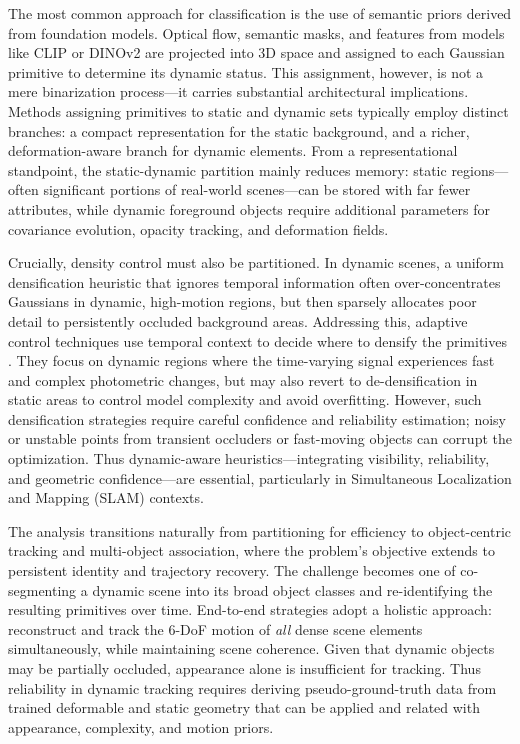 \documentclass[11pt,a4paper]{article}
\begin{document}
The most common approach for classification is the use of semantic priors derived from foundation models. Optical flow, semantic masks, and features from models like CLIP or DINOv2 are projected into 3D space and assigned to each Gaussian primitive to determine its dynamic status. This assignment, however, is not a mere binarization process---it carries substantial architectural implications. Methods assigning primitives to static and dynamic sets typically employ distinct branches: a compact representation for the static background, and a richer, deformation-aware branch for dynamic elements. From a representational standpoint, the static-dynamic partition mainly reduces memory: static regions---often significant portions of real-world scenes---can be stored with far fewer attributes, while dynamic foreground objects require additional parameters for covariance evolution, opacity tracking, and deformation fields.

Crucially, density control must also be partitioned. In dynamic scenes, a uniform densification heuristic that ignores temporal information often over-concentrates Gaussians in dynamic, high-motion regions, but then sparsely allocates poor detail to persistently occluded background areas. Addressing this, adaptive control techniques use temporal context to decide where to densify the primitives \cite{arxiv:2606.00352v1}. They focus on dynamic regions where the time-varying signal experiences fast and complex photometric changes, but may also revert to de-densification in static areas to control model complexity and avoid overfitting. However, such densification strategies require careful confidence and reliability estimation; noisy or unstable points from transient occluders or fast-moving objects can corrupt the optimization. Thus dynamic-aware heuristics---integrating visibility, reliability, and geometric confidence---are essential, particularly in Simultaneous Localization and Mapping (SLAM) contexts.

The analysis transitions naturally from partitioning for efficiency to object-centric tracking and multi-object association, where the problem's objective extends to persistent identity and trajectory recovery. The challenge becomes one of co-segmenting a dynamic scene into its broad object classes and re-identifying the resulting primitives over time. End-to-end strategies adopt a holistic approach: reconstruct and track the 6-DoF motion of \emph{all} dense scene elements simultaneously, while maintaining scene coherence. Given that dynamic objects may be partially occluded, appearance alone is insufficient for tracking. Thus reliability in dynamic tracking requires deriving pseudo-ground-truth data from trained deformable and static geometry that can be applied and related with appearance, complexity, and motion priors.
\end{document}
